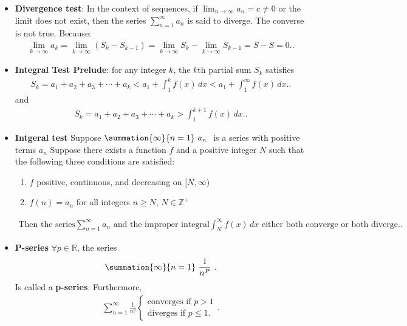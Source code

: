 \documentclass{report}
\begin{document}
\begin{itemize}
    \item \textbf{Divergence test}: In the context of sequences, if $\lim_{{n \to \infty}} a_n = c \neq 0$ or the limit does not exist, then the series $\sum_{{n=1}}^{\infty} a_n$ is said to diverge. The converse is not true.
        \bigbreak \noindent 
        Because:
        \begin{align*}
                \lim_{k \to \infty} a_k = \lim_{k \to \infty} (S_k - S_{k-1}) = \lim_{k \to \infty} S_k - \lim_{k \to \infty} S_{k-1} = S - S = 0.
        .\end{align*}
    \item \textbf{Integral Test Prelude}:
        for any integer $k$, the $k$th partial sum $S_k$ satisfies
        \begin{align*}
                S_k = a_1 + a_2 + a_3 + \cdots + a_k < a_1 + \int_{1}^{k} f(x) \, dx < a_1 + \int_{1}^{\infty} f(x) \, dx.
        .\end{align*}
        and
        \begin{align*}
                S_k = a_1 + a_2 + a_3 + \cdots + a_k > \int_{1}^{k+1} f(x) \, dx.
        .\end{align*}

    \item \textbf{Intgeral test}
        Suppose  $\summation{\infty}{n=1}\ a_{n}\  $ is a series with positive terms  $a_{n}$ Suppose there exists a function  $f $
        and a positive integer  $N$ 
      such that the following three conditions are satisfied:
        \begin{enumerate}
            \item \( f \) positive, continuous, and decreasing on $[N,\infty)$
            \item \( f(n) = a_n \) for all integers \( n \geq N \), $N \in \mathbb{Z^{+}} $
        \end{enumerate}
        \begin{align*}
            \text{Then the series} \sum_{n=1}^{\infty} a_n \text{ and the improper integral} \int_{N}^{\infty} f(x) \, dx \text{ either both converge or both diverge.}
        .\end{align*}

    \item \textbf{P-series}
       $\forall p \in \mathbb{R}$, the series 
       \begin{align*}
           \summation{\infty}{n=1}\ \frac{1}{n^{P}}\ 
       .\end{align*}
       Is called a \textbf{p-series}. Furthermore, 
       \begin{align*}
           \sum_{n=1}^{\infty} \frac{1}{n^p} \begin{cases}
        \text{converges if } p>1 \\
        \text{diverges if } p \leq 1.
        \end{cases}
       .\end{align*}


\end{itemize}
\end{document}
